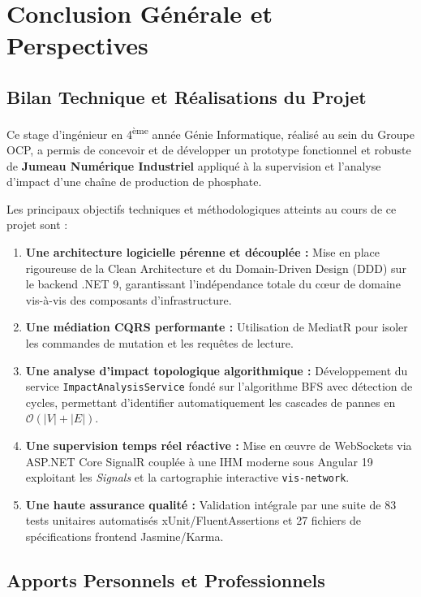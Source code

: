 ﻿\chapter{Conclusion Générale et Perspectives}

\section{Bilan Technique et Réalisations du Projet}

Ce stage d'ingénieur en 4\textsuperscript{ème} année Génie Informatique, réalisé au sein du Groupe OCP, a permis de concevoir et de développer un prototype fonctionnel et robuste de \textbf{Jumeau Numérique Industriel} appliqué à la supervision et l'analyse d'impact d'une chaîne de production de phosphate.

Les principaux objectifs techniques et méthodologiques atteints au cours de ce projet sont :
\begin{enumerate}
    \item \textbf{Une architecture logicielle pérenne et découplée :} Mise en place rigoureuse de la Clean Architecture et du Domain-Driven Design (DDD) sur le backend .NET 9, garantissant l'indépendance totale du cœur de domaine vis-à-vis des composants d'infrastructure.
    \item \textbf{Une médiation CQRS performante :} Utilisation de MediatR pour isoler les commandes de mutation et les requêtes de lecture.
    \item \textbf{Une analyse d'impact topologique algorithmique :} Développement du service \texttt{ImpactAnalysisService} fondé sur l'algorithme BFS avec détection de cycles, permettant d'identifier automatiquement les cascades de pannes en $\mathcal{O}(|V|+|E|)$.
    \item \textbf{Une supervision temps réel réactive :} Mise en œuvre de WebSockets via ASP.NET Core SignalR couplée à une IHM moderne sous Angular 19 exploitant les \textit{Signals} et la cartographie interactive \texttt{vis-network}.
    \item \textbf{Une haute assurance qualité :} Validation intégrale par une suite de 83 tests unitaires automatisés xUnit/FluentAssertions et 27 fichiers de spécifications frontend Jasmine/Karma.
\end{enumerate}

\section{Apports Personnels et Professionnels}

